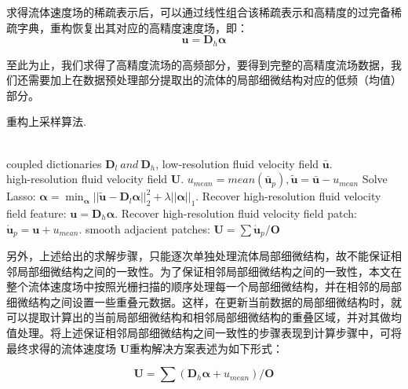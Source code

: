 求得流体速度场的稀疏表示后，可以通过线性组合该稀疏表示和高精度的过完备稀疏字典，重构恢复出其对应的高精度速度场，即：
\begin{equation}
\boldsymbol u= \boldsymbol D_h \boldsymbol \alpha
\end{equation}

至此为止，我们求得了高精度流场的高频部分，要得到完整的高精度流场数据，我们还需要加上在数据预处理部分提取出的流体的局部细微结构对应的低频（均值）部分。

\begin{algorithm}%
\caption{ 重构上采样算法.}
\label{alg:reconstruction}
\begin{algorithmic}[1] %
\REQUIRE ~~\\ %
coupled dictionaries $\boldsymbol D_l \ and \ \boldsymbol D_h$, low-resolution fluid velocity field $\bar {\boldsymbol u}$.
\ENSURE ~~\\ %
high-resolution fluid velocity field $\boldsymbol U$. 
    \STATE $u_{mean} = mean(\bar {\boldsymbol u}_p), \tilde {\boldsymbol u} = \boldsymbol {\bar u} - u_{mean}$ 
    \STATE  Solve Lasso: 
        $\boldsymbol \alpha= \min_{\boldsymbol \alpha} || \boldsymbol {\tilde u} - \boldsymbol D_l \boldsymbol \alpha||_2^2 + \lambda ||\boldsymbol \alpha||_1$.
    \STATE Recover high-resolution fluid velocity field feature:
        $\boldsymbol u = \boldsymbol D_h \boldsymbol \alpha$.
    \STATE Recover high-resolution fluid velocity field patch:
        $\acute {\boldsymbol u}_p = \boldsymbol u + u_{mean} $.
\ENDFOR
\STATE smooth adjacient patches:
     $\boldsymbol U = \sum \acute {\boldsymbol u}_p/ \boldsymbol O$
\end{algorithmic}
\end{algorithm}

另外，上述给出的求解步骤，只能逐次单独处理流体局部细微结构，故不能保证相邻局部细微结构之间的一致性。为了保证相邻局部细微结构之间的一致性，本文在整个流体速度场中按照光栅扫描的顺序处理每一个局部细微结构，并在相邻的局部细微结构之间设置一些重叠元数据。这样，在更新当前数据的局部细微结构时，就可以提取计算出的当前局部细微结构和相邻局部细微结构的重叠区域，并对其做均值处理。将上述保证相邻局部细微结构之间一致性的步骤表现到计算步骤中，可将最终求得的流体速度场 $\boldsymbol U$重构解决方案表述为如下形式：

\begin{equation}
\boldsymbol U=\sum (\boldsymbol D_h \boldsymbol \alpha + u_{mean})/ \boldsymbol O
\end{equation}

